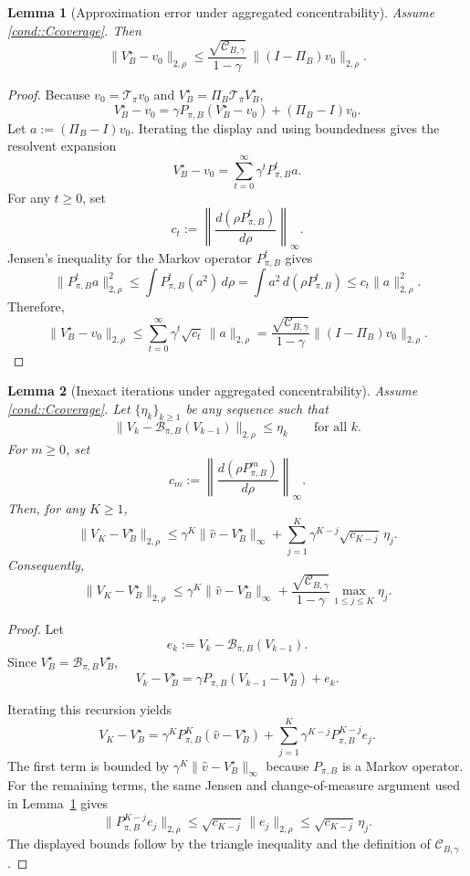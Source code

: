 \documentclass{article}
\theoremstyle{plain}
\newtheorem{lemma}{Lemma}
\theoremstyle{definition}
\theoremstyle{remark}
\begin{document}
\begin{lemma}[Approximation error under aggregated concentrability]
\label{lemma::approxerror}
Assume \ref{cond::Ccoverage}. Then
\[
\|V_B^\star - v_0\|_{2,\rho}
\le
\frac{\sqrt{\mathcal C_{B,\gamma}}}{1-\gamma}\,
\|(I-\Pi_B)v_0\|_{2,\rho}.
\]
\end{lemma}

\begin{proof}
Because \(v_0=\mathcal T_\pi v_0\) and
\(V_B^\star=\Pi_B\mathcal T_\pi V_B^\star\),
\[
V_B^\star-v_0
=
\gamma P_{\pi,B}(V_B^\star-v_0)
+
(\Pi_B-I)v_0 .
\]
Let \(a:=(\Pi_B-I)v_0\). Iterating the display and using boundedness gives the
resolvent expansion
\[
V_B^\star-v_0
=
\sum_{t=0}^\infty \gamma^t P_{\pi,B}^t a .
\]
For any \(t\ge0\), set
\[
c_t
:=
\left\|
\frac{d(\rho P_{\pi,B}^t)}{d\rho}
\right\|_\infty .
\]
Jensen's inequality for the Markov operator \(P_{\pi,B}^t\) gives
\[
\|P_{\pi,B}^t a\|_{2,\rho}^2
\le
\int P_{\pi,B}^t(a^2)\,d\rho
=
\int a^2\,d(\rho P_{\pi,B}^t)
\le
c_t\|a\|_{2,\rho}^2 .
\]
Therefore,
\[
\|V_B^\star-v_0\|_{2,\rho}
\le
\sum_{t=0}^\infty \gamma^t\sqrt{c_t}\,\|a\|_{2,\rho}
=
\frac{\sqrt{\mathcal C_{B,\gamma}}}{1-\gamma}
\|(I-\Pi_B)v_0\|_{2,\rho}.
\]
\end{proof}


\begin{lemma}[Inexact iterations under aggregated concentrability]
\label{lemma::inexacterrors}
Assume \ref{cond::Ccoverage}. Let \(\{\eta_k\}_{k\ge1}\) be any sequence such
that
\[
\|V_k - \mathcal B_{\pi,B}(V_{k-1})\|_{2,\rho}
\le
\eta_k
\qquad\text{for all } k.
\]
For \(m\ge0\), set
\[
c_m
:=
\left\|
\frac{d(\rho P_{\pi,B}^m)}{d\rho}
\right\|_\infty .
\]
Then, for any \(K\ge1\),
\[
\|V_K - V_B^\star\|_{2,\rho}
\le
\gamma^K\|\hat v - V_B^\star\|_\infty
+
\sum_{j=1}^K
\gamma^{K-j}\sqrt{c_{K-j}}\,\eta_j .
\]
Consequently,
\[
\|V_K - V_B^\star\|_{2,\rho}
\le
\gamma^K\|\hat v - V_B^\star\|_\infty
+
\frac{\sqrt{\mathcal C_{B,\gamma}}}{1-\gamma}
\max_{1\le j\le K}\eta_j .
\]
\end{lemma}

\begin{proof}
Let
\[
e_k:=V_k-\mathcal B_{\pi,B}(V_{k-1}).
\]
Since \(V_B^\star=\mathcal B_{\pi,B}V_B^\star\),
\[
V_k-V_B^\star
=
\gamma P_{\pi,B}(V_{k-1}-V_B^\star)+e_k.
\]

Iterating this recursion yields
\[
V_K-V_B^\star
=
\gamma^K P_{\pi,B}^K(\hat v-V_B^\star)
+
\sum_{j=1}^K\gamma^{K-j}P_{\pi,B}^{K-j}e_j .
\]
The first term is bounded by
\(\gamma^K\|\hat v-V_B^\star\|_\infty\) because \(P_{\pi,B}\) is a Markov
operator. For the remaining terms, the same Jensen and change-of-measure
argument used in Lemma~\ref{lemma::approxerror} gives
\[
\|P_{\pi,B}^{K-j}e_j\|_{2,\rho}
\le
\sqrt{c_{K-j}}\,\|e_j\|_{2,\rho}
\le
\sqrt{c_{K-j}}\,\eta_j .
\]
The displayed bounds follow by the triangle inequality and the definition of
\(\mathcal C_{B,\gamma}\).
\end{proof}
\end{document}
